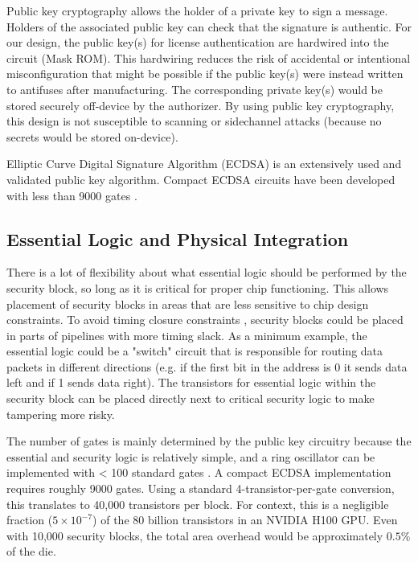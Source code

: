 \documentclass{article}
\begin{document}
Public key cryptography allows the holder of a private key to sign a message. Holders of the associated public key can check that the signature is authentic. For our design, the public key(s) for license authentication are hardwired into the circuit (Mask ROM). This hardwiring reduces the risk of accidental or intentional misconfiguration that might be possible if the public key(s) were instead written to antifuses after manufacturing. The corresponding private key(s) would be stored securely off-device by the authorizer. By using public key cryptography, this design is not susceptible to scanning or sidechannel attacks (because no secrets would be stored on-device). 

Elliptic Curve Digital Signature Algorithm (ECDSA) is an extensively used and validated public key algorithm. Compact ECDSA circuits have been developed with less than 9000 gates \cite{wenger_hardware_2011}. 

\subsection{Essential Logic and Physical Integration}

There is a lot of flexibility about what essential logic should be performed by the security block, so long as it is critical for proper chip functioning. This allows placement of security blocks in areas that are less sensitive to chip design constraints. To avoid timing closure constraints \cite{chadha_static_2009}, security blocks could be placed in parts of pipelines with more timing slack. As a minimum example, the essential logic could be a "switch" circuit that is responsible for routing data packets in different directions (e.g. if the first bit in the address is 0 it sends data left and if 1 sends data right). The transistors for essential logic within the security block can be placed directly next to critical security logic to make tampering more risky.

The number of gates is mainly determined by the public key circuitry because the essential and security logic is relatively simple, and a ring oscillator can be implemented with < 100 standard gates \cite{vasyltsov_fast_2008}. A compact ECDSA implementation requires roughly 9000 gates. Using a standard 4-transistor-per-gate conversion, this translates to 40,000 transistors per block. For context, this is a negligible fraction ($5 \times 10^{-7}$) of the 80 billion transistors in an NVIDIA H100 GPU. Even with 10,000 security blocks, the total area overhead would be approximately $0.5\%$ of the die.
\end{document}
